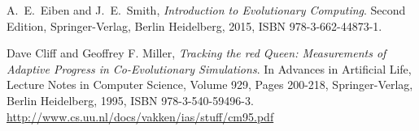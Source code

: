 \documentclass{article}
\begin{document}
\begin{thebibliography}{10}

A.~E.~Eiben and J.~E.~Smith, \textit{Introduction to Evolutionary Computing}. Second Edition, Springer-Verlag, Berlin Heidelberg, 2015, ISBN 978-3-662-44873-1.

Dave Cliff and Geoffrey F. Miller, \textit{Tracking the red Queen: Measurements of Adaptive Progress in Co-Evolutionary Simulations}. In Advances in Artificial Life, Lecture Notes in Computer Science, Volume 929, Pages 200-218, Springer-Verlag, Berlin Heidelberg, 1995, ISBN 978-3-540-59496-3. \url{http://www.cs.uu.nl/docs/vakken/ias/stuff/cm95.pdf}

\end{thebibliography}
\end{document}
